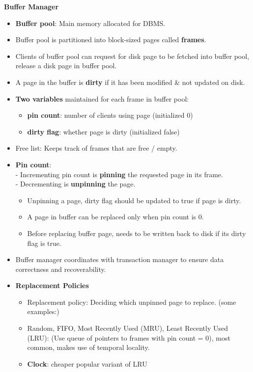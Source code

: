 \documentclass[10pt, landscape]{article}
\begin{document}
\begin{multicols*}{3}
\textbf{Buffer Manager}
\begin{itemize}
\item \textbf{Buffer pool}: Main memory allocated for DBMS.
\item Buffer pool is partitioned into block-sized pages called \textbf{frames}.
\item Clients of buffer pool can request for disk page to be fetched into buffer pool, release a disk page in buffer pool.
\item A page in the buffer is \textbf{dirty} if it has been modified \& not updated on disk.
\item \textbf{Two variables} maintained for each frame in buffer pool: 
	\begin{itemize}
		\item \textbf{pin count}: number of clients using page (initialized 0)
		\item \textbf{dirty flag}: whether page is dirty (initialized false)
	\end{itemize}
\item Free list: Keeps track of frames that are free / empty.
\item \textbf{Pin count}: \\
- Incrementing pin count is \textbf{pinning} the requested page in its frame. \\
- Decrementing is \textbf{unpinning} the page. 
	\begin{itemize}
		\item Unpinning a page, dirty flag should be updated to true if page is dirty.
		\item A page in buffer can be replaced only when pin count is 0. 
		\item Before replacing buffer page, needs to be written back to disk if its dirty flag is true. 
	\end{itemize}
\item Buffer manager coordinates with transaction manager to ensure data correctness and recoverability.
\item \textbf{Replacement Policies}
	\begin{itemize}
		\item Replacement policy: Deciding which unpinned page to replace. (some examples:)
		\item Random, FIFO, Most Recently Used (MRU), Least Recently Used (LRU): (Use queue of pointers to frames with pin count = 0), most common, makes use of temporal locality.
		\item \textbf{Clock}: cheaper popular variant of LRU \\

\end{itemize}
\end{itemize}
\end{multicols*}
\end{document}
